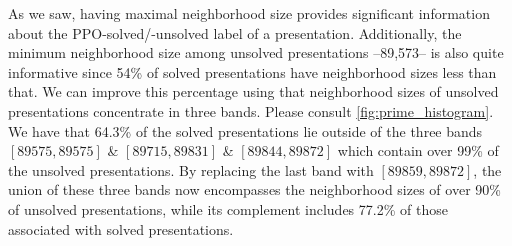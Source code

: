 
As we saw, having maximal neighborhood size provides significant information about the PPO-solved/-unsolved label of a presentation.
Additionally, the minimum neighborhood size among unsolved presentations --89,573-- is also quite informative since 54\% of solved presentations have neighborhood sizes less than that.
We can improve this percentage using that neighborhood sizes of unsolved presentations concentrate in three bands.
Please consult \autoref{fig:prime_histogram}.
We have that 64.3\% of the solved presentations lie outside of the three bands $[89575, 89575]$ \& $[89715, 89831]$ \& $[89844, 89872]$ which contain over 99\% of the unsolved presentations.
By replacing the last band with $[89859,89872]$, the union of these three bands now encompasses the neighborhood sizes of over 90\% of unsolved presentations, while its complement includes 77.2\% of those associated with solved presentations.

